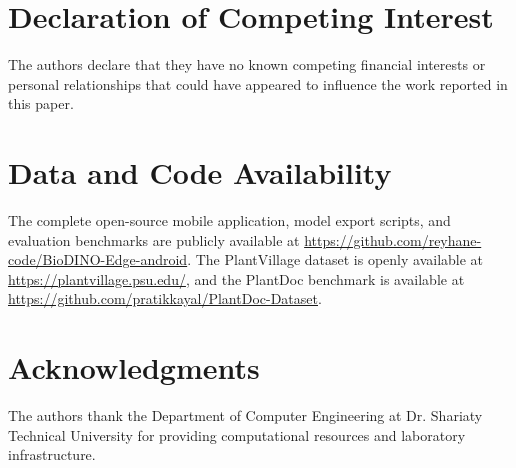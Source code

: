 \documentclass[a4paper,fleqn,nologo]{cas-dc}
\begin{document}
\printcredits

\section*{Declaration of Competing Interest}
The authors declare that they have no known competing financial interests or personal relationships that could have appeared to influence the work reported in this paper.

\section*{Data and Code Availability}
The complete open-source mobile application, model export scripts, and evaluation benchmarks are publicly available at \url{https://github.com/reyhane-code/BioDINO-Edge-android}. The PlantVillage dataset is openly available at \url{https://plantvillage.psu.edu/}, and the PlantDoc benchmark is available at \url{https://github.com/pratikkayal/PlantDoc-Dataset}.

\section*{Acknowledgments}
The authors thank the Department of Computer Engineering at Dr. Shariaty Technical University for providing computational resources and laboratory infrastructure.



\end{document}
